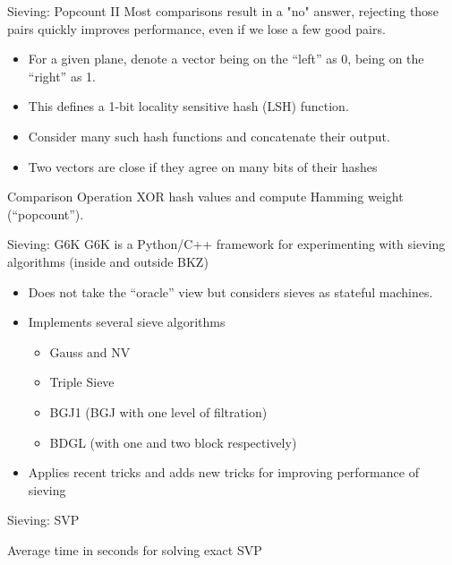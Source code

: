 \documentclass[table,10pt,aspectratio=169]{beamer}
\begin{document}
\begin{frame}[label={sec:orgd61fc55}]{Sieving: Popcount II}
Most comparisons result in a "no" answer, rejecting those pairs quickly improves performance, even if we lose a few good pairs.

\begin{itemize}
\item For a given plane, denote a vector being on the “left” as 0, being on the “right” as 1.
\item This defines a 1-bit locality sensitive hash (LSH) function.
\item Consider many such hash functions and concatenate their output.
\item Two vectors are close if they agree on many bits of their hashes
\end{itemize}

\begin{block}{Comparison Operation}
XOR hash values and compute Hamming weight (“popcount”).
\end{block}
\end{frame}

\begin{frame}[label={sec:org522cf63}]{Sieving: G6K}
G6K  is a Python/C++ framework for experimenting with sieving algorithms (inside and outside BKZ)
\begin{itemize}
\item Does not take the “oracle” view but considers sieves as stateful machines.
\item Implements several sieve algorithms
\begin{itemize}
\item Gauss and NV
\item Triple Sieve
\item BGJ1 (BGJ with one level of filtration)
\item BDGL (with one and two block respectively)
\end{itemize}
\item Applies recent tricks and adds new tricks for improving performance of sieving
\end{itemize}
\end{frame}

\begin{frame}[label={sec:orgd676f11}]{Sieving: SVP}
\begin{center}
Average time in seconds for solving exact SVP
\end{center}
\end{frame}
\end{document}
